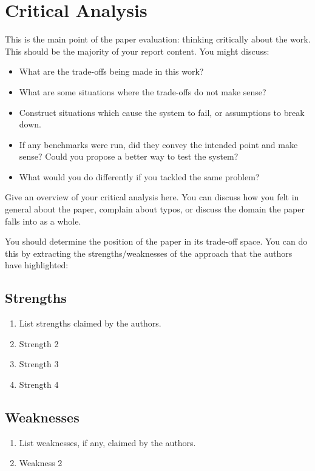 \documentclass{proc}
\begin{document}
\section{Critical Analysis}
This is the main point of the paper evaluation: thinking critically about the work. This should be the majority of your report content. You might discuss:
\begin{itemize}
\item What are the trade-offs being made in this work?
\item What are some situations where the trade-offs do not make sense?
\item Construct situations which cause the system to fail, or assumptions to break down.
\item If any benchmarks were run, did they convey the intended point and make sense? Could you propose a better way to test the system?
\item What would you do differently if you tackled the same problem?
\end{itemize}
Give an overview of your critical analysis here. You can discuss how you felt in general about the paper, complain about typos, or discuss the domain the paper falls into as a whole.

You should determine the position of the paper in its trade-off space. You can do this by extracting the strengths/weaknesses of the approach that the authors have highlighted:

\subsection{Strengths}
\begin{enumerate}
\item List strengths claimed by the authors.
\item Strength 2
\item Strength 3
\item Strength 4
\end{enumerate}

\subsection{Weaknesses}
\begin{enumerate}
\item List weaknesses, if any, claimed by the authors.
\item Weakness 2
\end{enumerate}
\end{document}
